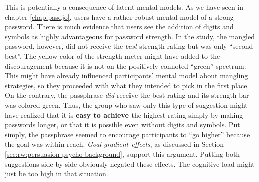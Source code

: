 This is potentially a consequence of latent mental models. As we have seen in chapter \ref{chap:pasdjo}, users have a rather robust mental model of a strong password. There is much evidence that users see the addition of digits and symbols as highly advantageous for password strength. In the study, the mangled password, however, did not receive the \textit{best} strength rating but was only ``second best''. The yellow color of the strength meter might have added to the discouragement because it is not on the positively connoted ``green'' spectrum. This might have already influenced participants' mental model about mangling strategies, so they proceeded with what they intended to pick in the first place. On the contrary, the passphrase \textit{did} receive the best rating and its strength bar was colored green. Thus, the group who saw only this type of suggestion might have realized that it is \textbf{easy to achieve} the highest rating simply by making passwords longer, or that it is possible even without digits and symbols. Put simply, the passphrase seemed to encourage participants to ``go higher'' because the goal was within reach. \textit{Goal gradient effects}, as discussed in Section \ref{sec:rw:persuasion-psycho-background}, support this argument. Putting both suggestions side-by-side obviously negated these effects. The cognitive load might just be too high in that situation. 



